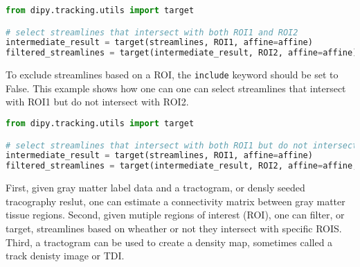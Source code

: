 \begin{lstlisting}[language=python]
from dipy.tracking.utils import target

# select streamlines that intersect with both ROI1 and ROI2
intermediate_result = target(streamlines, ROI1, affine=affine)
filtered_streamlines = target(intermediate_result, ROI2, affine=affine)

\end{lstlisting}

To exclude streamlines based on a ROI, the \verb|include| keyword should be set to False. This example shows how one can one can select streamlines that intersect with ROI1 but do not intersect with ROI2.

\begin{lstlisting}[language=python]
from dipy.tracking.utils import target

# select streamlines that intersect with both ROI1 but do not intersect with ROI2
intermediate_result = target(streamlines, ROI1, affine=affine)
filtered_streamlines = target(intermediate_result, ROI2, affine=affine, include=False)

\end{lstlisting}

First, given gray matter label data and a tractogram, or densly seeded tracography reslut, one can estimate a connectivity matrix between gray matter tissue regions. Second, given mutiple regions of interest (ROI), one can filter, or target, streamlines based on wheather or not they intersect with specific ROIS. Third, a tractogram can be used to create a density map, sometimes called a track denisty image or TDI. 